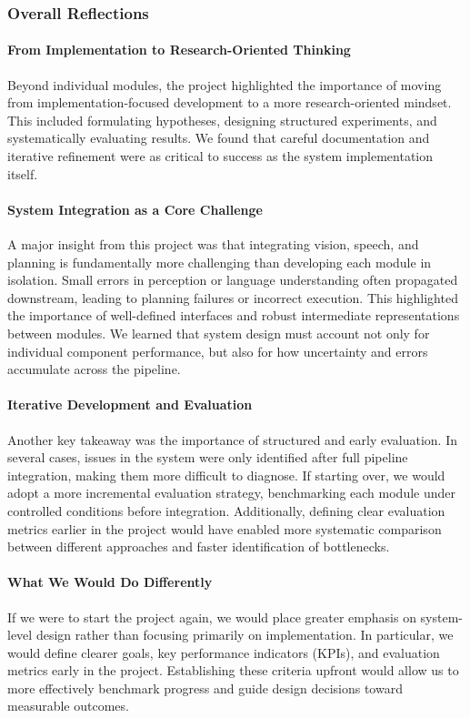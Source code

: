 \documentclass[12pt]{extarticle}
\begin{document}
\subsubsection{Overall Reflections}

\paragraph{From Implementation to Research-Oriented Thinking}
Beyond individual modules, the project highlighted the importance of moving from implementation-focused development to a more research-oriented mindset. This included formulating hypotheses, designing structured experiments, and systematically evaluating results. We found that careful documentation and iterative refinement were as critical to success as the system implementation itself.

\paragraph{System Integration as a Core Challenge}
A major insight from this project was that integrating vision, speech, and planning is fundamentally more challenging than developing each module in isolation. Small errors in perception or language understanding often propagated downstream, leading to planning failures or incorrect execution. This highlighted the importance of well-defined interfaces and robust intermediate representations between modules. We learned that system design must account not only for individual component performance, but also for how uncertainty and errors accumulate across the pipeline.

\paragraph{Iterative Development and Evaluation}
Another key takeaway was the importance of structured and early evaluation. In several cases, issues in the system were only identified after full pipeline integration, making them more difficult to diagnose. If starting over, we would adopt a more incremental evaluation strategy, benchmarking each module under controlled conditions before integration. Additionally, defining clear evaluation metrics earlier in the project would have enabled more systematic comparison between different approaches and faster identification of bottlenecks.

\paragraph{What We Would Do Differently}
If we were to start the project again, we would place greater emphasis on system-level design rather than focusing primarily on implementation. In particular, we would define clearer goals, key performance indicators (KPIs), and evaluation metrics early in the project. Establishing these criteria upfront would allow us to more effectively benchmark progress and guide design decisions toward measurable outcomes.
\end{document}
